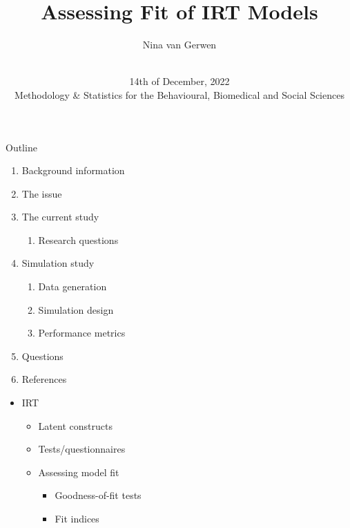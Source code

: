 \documentclass[aspectratio=169]{beamer}
\title{Assessing Fit of IRT Models}
\author{Nina van Gerwen}
\date{\vspace{2cm} \\ 14th of December, 2022 \\
\small{Methodology \& Statistics for the Behavioural, Biomedical and Social Sciences}}
\begin{document}
\maketitle

\begin{frame}{Outline}

\begin{enumerate}
	\item{Background information}
	\item{The issue}
	\item{The current study}
		\begin{enumerate}
			\item{Research questions}
		\end{enumerate}
	\item{Simulation study}
		\begin{enumerate}
			\item{Data generation}
			\item{Simulation design}
			\item{Performance metrics}
		\end{enumerate}
	\item{Questions}
	\item{References}
\end{enumerate}

\end{frame}

\begin{frame}

\begin{itemize}
	\item{IRT}
		\begin{itemize}
			\item{Latent constructs}
			\item{Tests/questionnaires}
			\item{Assessing model fit}
				\begin{itemize}
					\item{Goodness-of-fit tests}
					\item{Fit indices}
				\end{itemize}
		\end{itemize}
\end{itemize}



\end{frame}
\end{document}
